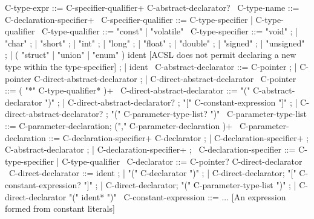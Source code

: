 \begin{syntax}
C-type-expr ::= C-specifier-qualifier+ C-abstract-declarator?
\
C-type-name ::= C-declaration-specifier+
\
C-specifier-qualifier ::= C-type-specifier | C-type-qualifier
\
C-type-qualifier ::= "const" | "volatile"
\
C-type-specifier ::= "void" ;
                   | "char" ;
                   | "short" ;
                   | "int" ;
                   | "long" ;
                   | "float" ;
                   | "double" ;
                   | "signed" ;
                   | "unsigned" ;
                   | ( "struct" | "union" | "enum" ) ident [ACSL does not permit declaring a new type within the type-specifier] ;
                   | ident
\
C-abstract-declarator ::= C-pointer ;
| C-pointer C-direct-abstract-declarator ;
| C-direct-abstract-declarator
\
C-pointer ::= ( "*" C-type-qualifier* )+
\
C-direct-abstract-declarator ::= "(" C-abstract-declarator ")" ; 
| C-direct-abstract-declarator? ;
  "[" C-constant-expression "]" ;
| C-direct-abstract-declarator? ;
  "(" C-parameter-type-list? ")"
\
C-parameter-type-list ::= C-parameter-declaration;
 ("," C-parameter-declaration )+
\
C-parameter-declaration ::= C-declaration-specifier+ C-declarator ;
                          | C-declaration-specifier+ ;
                            C-abstract-declarator ;
                          | C-declaration-specifier+ ;
\
C-declaration-specifier ::= C-type-specifier | C-type-qualifier
\
C-declarator ::= C-pointer? C-direct-declarator
\
C-direct-declarator ::= ident ;
                      | "(" C-declarator ")" ;
                      | C-direct-declarator;
                        "[" C-constant-expression? "]" ;
                      | C-direct-declarator;
                        "(" C-parameter-type-list ")" ;
                      | C-direct-declarator "(" ident* ")"
\
C-constant-expression ::=  ... [An expression formed from constant literals]
\end{syntax}
